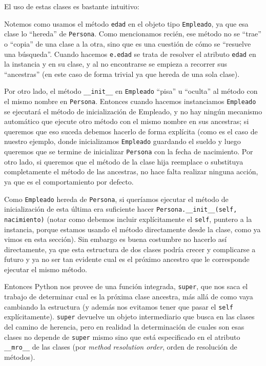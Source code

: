 
El uso de estas clases es bastante intuitivo:


Notemos como usamos el método \texttt{edad} en el objeto tipo \texttt{Empleado}, ya que esa clase lo ``hereda'' de \texttt{Persona}. Como mencionamos recién, ese método no se ``trae'' o ``copia'' de una clase a la otra, sino que es una cuestión de cómo se ``resuelve una búsqueda''. Cuando hacemos \texttt{e.edad} se trata de resolver el atributo \texttt{edad} en la instancia y en su clase, y al no encontrarse se empieza a recorrer sus ``ancestras'' (en este caso de forma trivial ya que hereda de una sola clase).

Por otro lado, el método \texttt{\_\_init\_\_} en \texttt{Empleado} ``pisa'' u ``oculta'' al método con el mismo nombre en \texttt{Persona}. Entonces cuando hacemos instanciamos \texttt{Empleado} se ejecutará el método de inicialización de Empleado, y no hay ningún mecanismo automático que ejecute otro método con el mismo nombre en sus ancestras; si queremos que eso suceda debemos hacerlo de forma explícita (como es el caso de nuestro ejemplo, donde inicializamos \texttt{Empleado} guardando el sueldo y luego queremos que se termine de inicializar \texttt{Persona} con la fecha de nacimiento. Por otro lado, si queremos que el método de la clase hija reemplace o substituya completamente el método de las ancestras, no hace falta realizar ninguna acción, ya que es el comportamiento por defecto.

Como \texttt{Empleado} hereda de \texttt{Persona}, si queríamos ejecutar el método de inicialización de esta última era suficiente hacer \texttt{Persona.\_\_init\_\_(self, nacimiento)} (notar como debemos incluir explícitamente el \texttt{self}, puntero a la instancia, porque estamos usando el método directamente desde la clase, como ya vimos en esta sección). Sin embargo es buena costumbre no hacerlo así directamente, ya que esta estructura de dos clases podría crecer y complicarse a futuro y ya no ser tan evidente cual es el próximo ancestro que le corresponde ejecutar el mismo método. 

Entonces Python nos provee de una función integrada, \texttt{super}, que nos saca el trabajo de determinar cual es la próxima clase ancestra, más allá de como vaya cambiando la estructura (y además nos evitamos tener que pasar el \texttt{self} explícitamente). \texttt{super} devuelve un objeto intermediario que busca en las clases del camino de herencia, pero en realidad la determinación de cuales son esas clases no depende de \texttt{super} mismo sino que está especificado en el atributo \texttt{\_\_mro\_\_} de las clases (por \textit{method resolution order}, orden de resolución de métodos).

